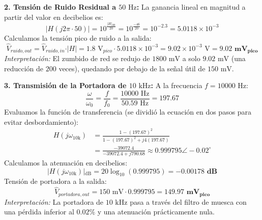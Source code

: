 \documentclass[11pt,a4paper,twoside]{article}
\begin{document}
\textbf{2. Tensión de Ruido Residual a $50\text{ Hz}$:}
La ganancia lineal en magnitud a partir del valor en decibelios es:
\begin{equation*}
    \vert{}H(j 2\pi \cdot 50)\vert{} = 10^{\frac{\vert{}H\vert{}_{\text{dB}}}{20}} = 10^{\frac{-46}{20}} = 10^{-2.3} = 5.0118 \times 10^{-3}
\end{equation*}
Calculamos la tensión pico de ruido a la salida:
\begin{equation*}
    \hat{V}_{ruido, out} = \hat{V}_{ruido, in} \cdot \vert{}H\vert{} = 1.8\text{ V}_{pico} \cdot 5.0118 \times 10^{-3} = 9.02 \times 10^{-3}\text{ V} = \mathbf{9.02\text{ mV}_{pico}}
\end{equation*}
\textit{Interpretación:} El zumbido de red se redujo de $1800\text{ mV}$ a solo $9.02\text{ mV}$ (una reducción de $200$ veces), quedando por debajo de la señal útil de $150\text{ mV}$.

\vspace{0.3cm}
\textbf{3. Transmisión de la Portadora de $10\text{ kHz}$:}
A la frecuencia $f = 10000\text{ Hz}$:
\begin{equation*}
    \frac{\omega}{\omega_0} = \frac{f}{f_0} = \frac{10000\text{ Hz}}{50.59\text{ Hz}} = 197.67
\end{equation*}
Evaluamos la función de transferencia (se dividió la ecuación en dos pasos para evitar desbordamiento):
\begin{align*}
    H(j\omega_{10\text{k}}) &= \frac{1 - (197.67)^2}{1 - (197.67)^2 + j 4 (197.67)} \\
    &= \frac{-39072.4}{-39072.4 + j 790.68} \approx \mathbf{0.999795} \angle -0.02^\circ
\end{align*}
Calculamos la atenuación en decibelios:
\begin{equation*}
    \vert{}H(j\omega_{10\text{k}})\vert{}_{\text{dB}} = 20 \log_{10}(0.999795) = \mathbf{-0.00178\text{ dB}}
\end{equation*}
Tensión de portadora a la salida:
\begin{equation*}
    \hat{V}_{portadora, out} = 150\text{ mV} \cdot 0.999795 = \mathbf{149.97\text{ mV}_{pico}}
\end{equation*}
\textit{Interpretación:} La portadora de $10\text{ kHz}$ pasa a través del filtro de muesca con una pérdida inferior al $0.02\%$ y una atenuación prácticamente nula.
\end{document}
